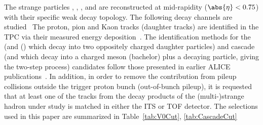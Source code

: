 The strange particles \kzero, \lmb, \almb, \Xis and \Oms are reconstructed at mid-rapidity ($\abs{\eta} < 0.75$) with their specific weak decay topology.
The following decay channels are studied~\cite{PhysRevD.98.030001}
The proton, pion and Kaon tracks (daughter tracks) are identified in the TPC via their measured energy deposition~\cite{Abelev:2014ffa}.
The identification methods for the \Vzero (\kzero and \lmb (\almb) which decay into two oppositely charged daughter particles) and cascade (\Xis and \Oms which decay into a charged meson (bachelor) plus a \Vzero decaying particle, giving the two-step process) candidates follow those presented in earlier ALICE publications~\cite{Aamodt:2011zza, Abelev:2012jp, Acharya:2018orn, Abelev:2013haa, Acharya:2020uxl, Acharya:2019kyh}.
In addition, in order to remove the contribution from pileup collisions outside the trigger proton bunch (out-of-bunch pileup), it is requested that at least one of the tracks from the decay products of the (multi-)strange hadron under study is matched in either the ITS or TOF detector.
The selections used in this paper are summarized in Table~\ref{tab:V0Cut}, \ref{tab:CascadeCut}
